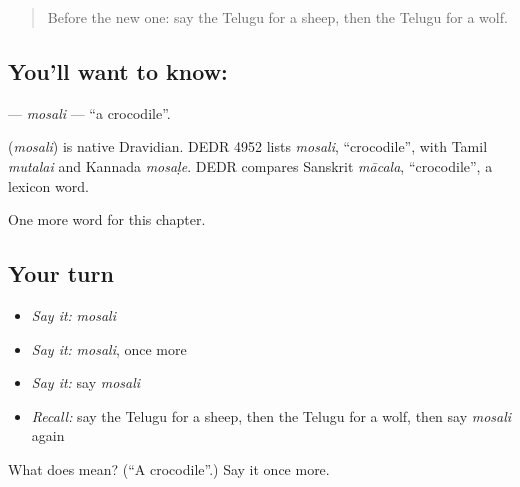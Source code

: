 \label{lesson:TE-C302-mosali}



\begin{quote}
Before the new one: say the Telugu for a sheep, then the Telugu for a wolf.
\end{quote}

\subsection*{You'll want to know: }
\textbf{} — \emph{mosali} — \textquotedblleft{}a crocodile\textquotedblright{}.

\begin{cousinweb}
\textbf{} (\emph{mosali}) is native Dravidian. DEDR 4952 lists \emph{mosali}, \textquotedblleft{}crocodile\textquotedblright{}, with Tamil \emph{mutalai} and Kannada \emph{mosaḷe}. DEDR compares Sanskrit \emph{mācala}, \textquotedblleft{}crocodile\textquotedblright{}, a lexicon word.
\end{cousinweb}

\begin{grammarlens}[title={What you've built}]
One more word for this chapter.
\end{grammarlens}

\subsection*{Your turn}
\begin{itemize}
\raggedright
  \item \emph{Say it:} \emph{mosali}
  \item \emph{Say it:} \emph{mosali}, once more
  \item \emph{Say it:} say \emph{mosali}
  \item \emph{Recall:} say the Telugu for a sheep, then the Telugu for a wolf, then say \emph{mosali} again
\end{itemize}

\begin{tcolorbox}[breakable,colback=teal!4,colframe=teal!35!black,title={Before you move on}]
What does  mean? (\textquotedblleft{}A crocodile\textquotedblright{}.) Say it once more.
\end{tcolorbox}
